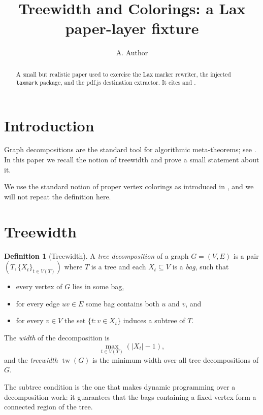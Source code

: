 \documentclass{article}
\title{Treewidth and Colorings: a Lax paper-layer fixture}
\author{A. Author}
\date{}
\theoremstyle{definition}
\newtheorem{definition}{Definition}
\begin{document}
\maketitle

\begin{abstract}
  A small but realistic paper used to exercise the Lax marker rewriter,
  the injected \texttt{laxmark} package, and the pdf.js destination
  extractor.  It cites \cite{robertson1986graph} and
  \cite{courcelle1990monadic}.
\end{abstract}

\section{Introduction}

Graph decompositions are the standard tool for algorithmic meta-theorems;
see \cite{robertson1986graph}.  In this paper we recall the notion of
treewidth and prove a small statement about it.

We use the standard notion of
proper vertex colorings
as introduced in \cite{courcelle1990monadic}, and we will not repeat the
definition here.

\section{Treewidth}

\begin{definition}[Treewidth]
  A \emph{tree decomposition} of a graph $G = (V, E)$ is a pair
  $(T, \{X_t\}_{t \in V(T)})$ where $T$ is a tree and each $X_t \subseteq V$
  is a \emph{bag}, such that
  \begin{itemize}
    \item every vertex of $G$ lies in some bag,
    \item for every edge $uv \in E$ some bag contains both $u$ and $v$, and
    \item for every $v \in V$ the set $\{t : v \in X_t\}$ induces a subtree
      of $T$.
  \end{itemize}
  The \emph{width} of the decomposition is
  \[
    \max_{t \in V(T)} \left( |X_t| - 1 \right),
  \]
  and the \emph{treewidth} $\operatorname{tw}(G)$ is the minimum width over
  all tree decompositions of $G$.
\end{definition}

The subtree condition is the one that makes dynamic programming over a
decomposition work: it guarantees that the bags containing a fixed vertex
form a connected region of the tree.
\end{document}
